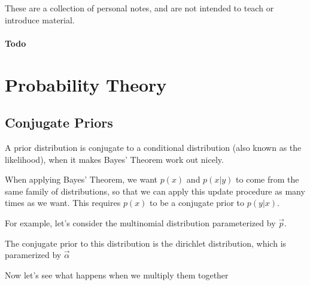 \documentclass[12pt]{article}
\begin{document}
\maketitle

These are a collection of personal notes, and are not intended to teach or introduce material.

\tableofcontents

\newpage

\paragraph{Todo}

  
\section{Probability Theory}

\subsection{Conjugate Priors}

A prior distribution is conjugate to a conditional distribution (also known as the likelihood), when it makes Bayes' Theorem work out nicely.


When applying Bayes' Theorem, we want $p(x)$ and $p(x|y)$ to come from the same family of distributions, so that we can apply this update procedure as many times as we want. This requires $p(x)$ to be a conjugate prior to $p(y|x)$.

For example, let's consider the multinomial distribution parameterized by $\vec p$.


The conjugate prior to this distribution is the dirichlet distribution, which is paramerized by $\vec \alpha$


Now let's see what happens when we multiply them together

\end{document}

